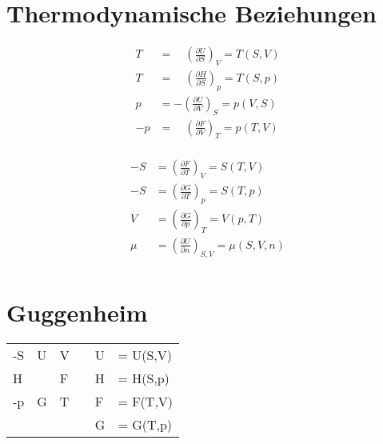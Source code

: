 \documentclass[twocolumn]{article}
\newcommand{\ultraskip}{\bigskip\bigskip\bigskip\bigskip\bigskip\bigskip}
\begin{document}
\section{Thermodynamische Beziehungen}

\begin{multicols}{2}

\begin{align*}
	T   	&= \quad \left(\frac{\partial U}{\partial S}\right)_{V} = T(S,V)  	\\
	T   	&= \quad \left(\frac{\partial H}{\partial S}\right)_{p} = T(S,p)  	\\
	p   	&= -\left(\frac{\partial U}{\partial V}\right)_{S} = p(V,S)	      	\\
	-p  	&= \quad \left(\frac{\partial F}{\partial V}\right)_{T} = p(T,V)	\\
\end{align*}

\begin{align*}
	-S 	&= \left(\frac{\partial F}{\partial T}\right)_{V} = S(T,V)		\\
	-S 	&= \left(\frac{\partial G}{\partial T}\right)_{p} = S(T,p)		\\
	 V 	&= \left(\frac{\partial G}{\partial p}\right)_{T} = V(p,T)		\\
	\mu 	&= \left(\frac{\partial U}{\partial n}\right)_{S,V} = \mu(S,V,n)	\\
\end{align*}
\end{multicols}


\section{Guggenheim}
\Large
\begin{tabular}{llllll}
	-S & U & V &	&U &= U(S,V) \\ 
	 H &   & F &   	&H &= H(S,p) \\
	-p & G & T &   	&F &= F(T,V) \\
	   &   &   &  	&G &= G(T,p) \\
\end{tabular}
\normalsize
\ultraskip
\pagebreak
\end{document}
